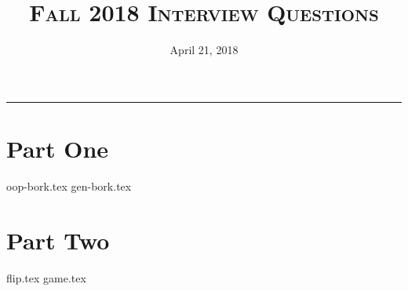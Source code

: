 \documentclass{exam}
\title{\textsc{Fall 2018 Interview Questions}}
\date{April 21, 2018}
\begin{document}
\maketitle
\rule{\textwidth}{0.15em}
\fontsize{12}{15}\selectfont

\begin{questions}
\section{Part One}
{oop-bork.tex}
{gen-bork.tex}
\newpage
\section{Part Two}
{flip.tex}
\newpage
{game.tex}
\end{questions}
\end{document}

